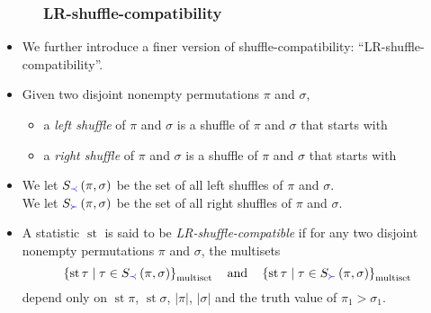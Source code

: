 \documentclass{beamer}
\newcommand{\blue}{\color{blue}}
\newcommand{\st}{\operatorname{st}}
\newcommand{\fti}[1]{\frametitle{\ \ \ \ \ #1}}
\newcommand{\set}[1]{\left\{ #1 \right\}}
\newcommand{\abs}[1]{\left| #1 \right|}
\newcommand{\tup}[1]{\left( #1 \right)}
\newcommand{\defn}[1]{{\color{darkred}\emph{#1}}} %
\theoremstyle{plain}
\begin{document}
\begin{frame}
\fti{LR-shuffle-compatibility}

\begin{itemize}

\item We further introduce a finer version of
      shuffle-compatibility: ``LR-shuffle-compatibility''.

\item Given two disjoint nonempty permutations $\pi$ and $\sigma$,
      \begin{itemize}
      \item
      a \defn{left shuffle} of $\pi$ and $\sigma$ is a shuffle
      of $\pi$ and $\sigma$ that starts with
      \item
      a \defn{right shuffle} of $\pi$ and $\sigma$ is a shuffle
      of $\pi$ and $\sigma$ that starts with
      \end{itemize}

\pause \pause
\item We let $S_{\blue \prec} \tup{\pi, \sigma}$ be the set of all {\blue left} shuffles of $\pi$
      and $\sigma$. \\
      We let $S_{\blue \succ} \tup{\pi, \sigma}$ be the set of all {\blue right} shuffles of $\pi$
      and $\sigma$.

\pause

\item A statistic $\st$ is said to be \defn{LR-shuffle-compatible}
      if for any two disjoint nonempty permutations $\pi$ and $\sigma$,
      the multisets
      \[
      \set{ \st\tau \mid \tau\in S_{\blue \prec} \tup{\pi, \sigma} }_{\text{multiset}}
      \quad \text{and} \quad
      \set{ \st\tau \mid \tau\in S_{\blue \succ} \tup{\pi, \sigma} }_{\text{multiset}}
      \]
      depend only on $\st \pi$, $\st \sigma$, $\abs{\pi}$,
      $\abs{\sigma}$ {\blue and the truth value of $\pi_1 > \sigma_1$}.




\end{itemize}
\end{frame}
\end{document}
